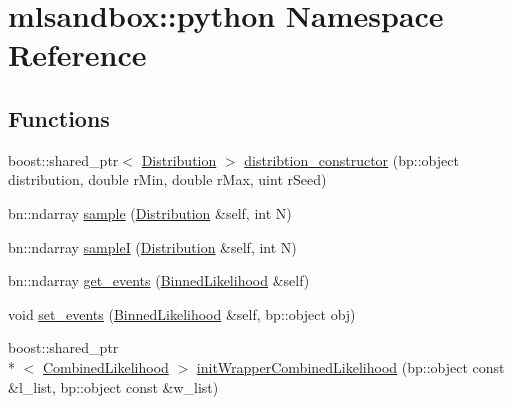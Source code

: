 \hypertarget{namespacemlsandbox_1_1python}{\section{mlsandbox\-:\-:python Namespace Reference}
\label{namespacemlsandbox_1_1python}
}
\subsection*{Functions}
\begin{DoxyCompactItemize}
\item 
boost\-::shared\-\_\-ptr$<$ \hyperlink{classDistribution}{Distribution} $>$ \hyperlink{namespacemlsandbox_1_1python_aa2d95d46d684b8e8a9e6041e6753904e}{distribtion\-\_\-constructor} (bp\-::object distribution, double r\-Min, double r\-Max, uint r\-Seed)
\item 
bn\-::ndarray \hyperlink{namespacemlsandbox_1_1python_a00273dd6c5be90398654d4e7c707add4}{sample} (\hyperlink{classDistribution}{Distribution} \&self, int N)
\item 
bn\-::ndarray \hyperlink{namespacemlsandbox_1_1python_a2a2c84be9021d9445d30be3d85447f9b}{sample\-I} (\hyperlink{classDistribution}{Distribution} \&self, int N)
\item 
bn\-::ndarray \hyperlink{namespacemlsandbox_1_1python_a34e7315520ddd52ff2425944ff0b7ceb}{get\-\_\-events} (\hyperlink{classBinnedLikelihood}{Binned\-Likelihood} \&self)
\item 
void \hyperlink{namespacemlsandbox_1_1python_a2b76c3fcdec9f6639cf79a73939c63a2}{set\-\_\-events} (\hyperlink{classBinnedLikelihood}{Binned\-Likelihood} \&self, bp\-::object obj)
\item 
boost\-::shared\-\_\-ptr\\*
$<$ \hyperlink{classCombinedLikelihood}{Combined\-Likelihood} $>$ \hyperlink{namespacemlsandbox_1_1python_a1e62411a6ea1b3d42e90559d5537ceb6}{init\-Wrapper\-Combined\-Likelihood} (bp\-::object const \&l\-\_\-list, bp\-::object const \&w\-\_\-list)
\end{DoxyCompactItemize}


